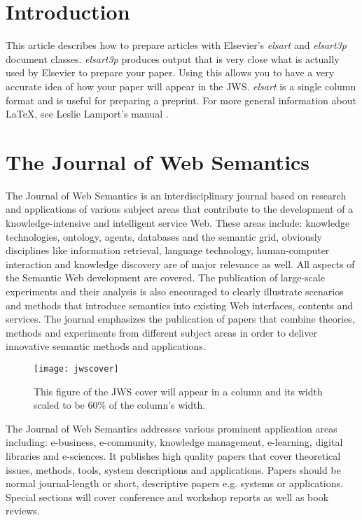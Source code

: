 \documentclass{elsart3p}    %
\begin{document}
\section{Introduction}
\label{intro}

This article describes how to prepare articles with
Elsevier's {\em elsart} and {\em elsart3p} document
classes.  {\em elsart3p} produces output that is very close
what is actually used by Elsevier to prepare your paper.
Using this allows you to have a very accurate idea of how
your paper will appear in the JWS. {\em elsart} is a single
column format and is useful for preparing a preprint.  For
more general information about \LaTeX{}, see Leslie
Lamport's manual \cite{lamport1994}.

\section{The Journal of Web Semantics}
\label{JWS}

The Journal of Web Semantics is an interdisciplinary journal based on
research and applications of various subject areas that contribute to
the development of a knowledge-intensive and intelligent service
Web. These areas include: knowledge technologies, ontology, agents,
databases and the semantic grid, obviously disciplines like
information retrieval, language technology, human-computer interaction
and knowledge discovery are of major relevance as well. All aspects of
the Semantic Web development are covered. The publication of
large-scale experiments and their analysis is also encouraged to
clearly illustrate scenarios and methods that introduce semantics into
existing Web interfaces, contents and services. The journal emphasizes
the publication of papers that combine theories, methods and
experiments from different subject areas in order to deliver
innovative semantic methods and applications.

\begin{figure}[t]
\centering \texttt{[image: jwscover]}
\caption{This figure of the JWS cover will appear in a
  column and its width scaled to be 60\% of the column's
  width.}
\label{fig:jws}
\end{figure}

The Journal of Web Semantics addresses various prominent
application areas including: e-business, e-community, knowledge
management, e-learning, digital libraries and e-sciences.  It
publishes high quality papers that cover theoretical issues,
methods, tools, system descriptions and applications. Papers
should be normal journal-length or short, descriptive papers
e.g. systems or applications. Special sections will cover
conference and workshop reports as well as book reviews.
\end{document}
